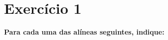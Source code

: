\documentclass[a4paper]{article}
\begin{document}
	\section*{Exercício 1}\textbf{Para cada uma das alíneas seguintes, indique:}
\begin{center}
\end{center}
\begin{center}
\end{center}
\end{document}
